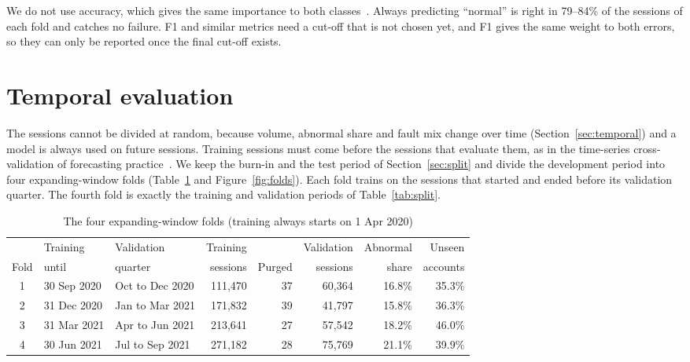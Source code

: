 \documentclass[12pt,a4paper,openany]{report}
\begin{document}
We do not use accuracy, which gives the same importance to both classes~\cite{mindd04}. Always predicting
``normal'' is right in 79--84\% of the sessions of each fold and catches no failure. F1 and similar metrics need a cut-off that is not chosen yet, and F1 gives the same weight to both
errors, so they can only be reported once the final cut-off exists.

\section{Temporal evaluation}\label{sec:folds}

The sessions cannot be divided at random, because volume, abnormal share and fault mix change over time
(Section~\ref{sec:temporal}) and a model is always used on future sessions. Training sessions must come before
the sessions that evaluate them, as in the time-series cross-validation of forecasting
practice~\cite{fpp3}. We keep the burn-in and the test period of Section~\ref{sec:split} and divide the
development period into four expanding-window folds (Table~\ref{tab:folds} and Figure~\ref{fig:folds}). Each fold
trains on the sessions that started and ended before its validation quarter. The fourth fold is exactly the
training and validation periods of Table~\ref{tab:split}.

\begin{table}[!htb]
  \centering\small
  \caption{The four expanding-window folds (training always starts on 1 Apr 2020)}
  \label{tab:folds}
  \setlength{\tabcolsep}{3pt}
  \begin{tabular*}{\textwidth}{@{\extracolsep{\fill}}cllrrrrr}
    \toprule
         & Training    & Validation & Training &        & Validation & Abnormal & Unseen   \\
    Fold & until       & quarter    & sessions & Purged & sessions   & share    & accounts \\
    \midrule
    1 & 30 Sep 2020 & Oct to Dec 2020 & 111,470 & 37 & 60,364 & 16.8\% & 35.3\% \\
    2 & 31 Dec 2020 & Jan to Mar 2021 & 171,832 & 39 & 41,797 & 15.8\% & 36.3\% \\
    3 & 31 Mar 2021 & Apr to Jun 2021 & 213,641 & 27 & 57,542 & 18.2\% & 46.0\% \\
    4 & 30 Jun 2021 & Jul to Sep 2021 & 271,182 & 28 & 75,769 & 21.1\% & 39.9\% \\
    \bottomrule
  \end{tabular*}
\end{table}
\end{document}
